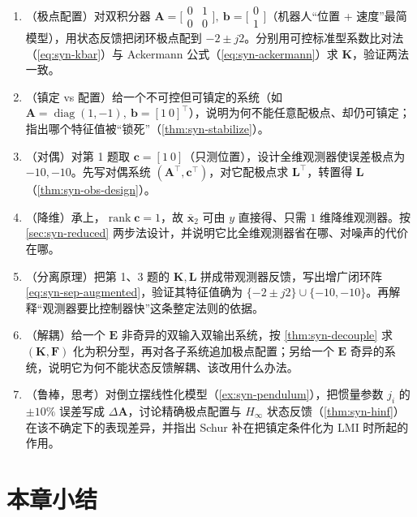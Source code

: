 \begin{practice}
\begin{enumerate}
  \item （极点配置）对双积分器 $\mathbf A=\big[\begin{smallmatrix}0&1\\0&0\end{smallmatrix}\big],\ \mathbf b=\big[\begin{smallmatrix}0\\1\end{smallmatrix}\big]$（机器人“位置 + 速度”最简模型），用状态反馈把闭环极点配到 $-2\pm j2$。分别用可控标准型系数比对法（\cref{eq:syn-kbar}）与 Ackermann 公式（\cref{eq:syn-ackermann}）求 $\mathbf K$，验证两法一致。
  \item （镇定 vs 配置）给一个不可控但可镇定的系统（如 $\mathbf A=\operatorname{diag}(1,-1),\ \mathbf b=[1\ 0]^\top$），说明为何不能任意配极点、却仍可镇定；指出哪个特征值被“锁死”（\cref{thm:syn-stabilize}）。
  \item （对偶）对第 1 题取 $\mathbf c=[1\ 0]$（只测位置），设计全维观测器使误差极点为 $-10,-10$。先写对偶系统 $(\mathbf A^\top,\mathbf c^\top)$，对它配极点求 $\mathbf L^\top$，转置得 $\mathbf L$（\cref{thm:syn-obs-design}）。
  \item （降维）承上，$\operatorname{rank}\mathbf c=1$，故 $\bar{\mathbf x}_2$ 可由 $y$ 直接得、只需 $1$ 维降维观测器。按 \cref{sec:syn-reduced} 两步法设计，并说明它比全维观测器省在哪、对噪声的代价在哪。
  \item （分离原理）把第 1、3 题的 $\mathbf K,\mathbf L$ 拼成带观测器反馈，写出增广闭环阵 \cref{eq:syn-sep-augmented}，验证其特征值确为 $\{-2\pm j2\}\cup\{-10,-10\}$。再解释“观测器要比控制器快”这条整定法则的依据。
  \item （解耦）给一个 $\mathbf E$ 非奇异的双输入双输出系统，按 \cref{thm:syn-decouple} 求 $(\mathbf K,\mathbf F)$ 化为积分型，再对各子系统追加极点配置；另给一个 $\mathbf E$ 奇异的系统，说明它为何不能状态反馈解耦、该改用什么办法。
  \item （鲁棒，思考）对倒立摆线性化模型（\cref{ex:syn-pendulum}），把惯量参数 $j_i$ 的 $\pm10\%$ 误差写成 $\Delta\mathbf A$，讨论精确极点配置与 $H_\infty$ 状态反馈（\cref{thm:syn-hinf}）在该不确定下的表现差异，并指出 Schur 补在把镇定条件化为 LMI 时所起的作用。
\end{enumerate}
\end{practice}

\section*{本章小结}

